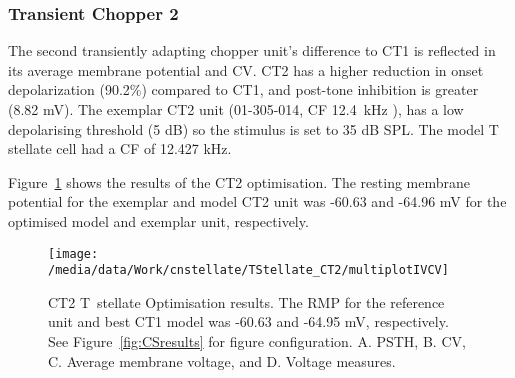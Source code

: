 \clearpage
\subsubsection{Transient Chopper 2}
The second transiently adapting chopper unit's difference to CT1 is reflected in its average membrane potential and CV.
CT2 has a higher reduction in onset depolarization (90.2\%) compared to CT1, and post-tone inhibition is greater (8.82 mV).
The exemplar CT2 unit (01-305-014, CF 12.4~kHz \citep*{PaoliniClareyEtAl:2005}), has a low depolarising threshold (5 dB) so the stimulus is set to 35 dB SPL.
The model T stellate cell had a CF of 12.427 kHz.



Figure~\ref{fig:CT2results} shows the results of the CT2 optimisation.
The resting membrane potential for the exemplar and model CT2 unit was -60.63 and -64.96 mV for the optimised model and exemplar unit, respectively.


\begin{figure}[htb]
 \centering
\texttt{[image: /media/data/Work/cnstellate/TStellate\_CT2/multiplotIVCV]}
  \caption[CT2 T~stellate Optimisation results]{CT2 T~stellate Optimisation
    results.
The RMP for the reference unit and best CT1 model was -60.63 and -64.95 mV, respectively.
See Figure~\ref{fig:CSresults} for figure configuration.
A. PSTH, B. CV, C. Average membrane voltage, and D. Voltage measures.}
  \label{fig:CT2results}
\end{figure}



